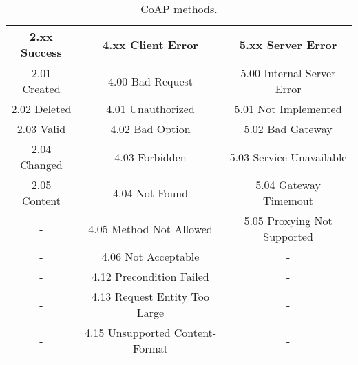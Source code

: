 	\begin{table}[h!]
		\begin{center}
			\begin{tabular}{|c|c|c|}
				\hline
				\textbf{2.xx Success} & \textbf{4.xx Client Error} & \textbf{5.xx Server Error}\\\hline
				2.01 Created & 4.00 Bad Request & 5.00 Internal Server Error\\\hline
				2.02 Deleted & 4.01 Unauthorized & 5.01 Not Implemented\\\hline
				2.03 Valid & 4.02 Bad Option & 5.02 Bad Gateway\\\hline
				2.04 Changed & 4.03 Forbidden & 5.03 Service Unavailable\\\hline
				2.05 Content & 4.04 Not Found & 5.04 Gateway Timemout\\\hline
				- & 4.05 Method Not Allowed & 5.05 Proxying Not Supported\\\hline
				- & 4.06 Not Acceptable & -\\\hline
				- & 4.12 Precondition Failed & -\\\hline
				- & 4.13 Request Entity Too Large & -\\\hline
				- & 4.15 Unsupported Content-Format & -\\
   				\hline
			\end{tabular}
			\caption{CoAP methods.}
			\label{tab:table13}
		\end{center}
	\end{table}